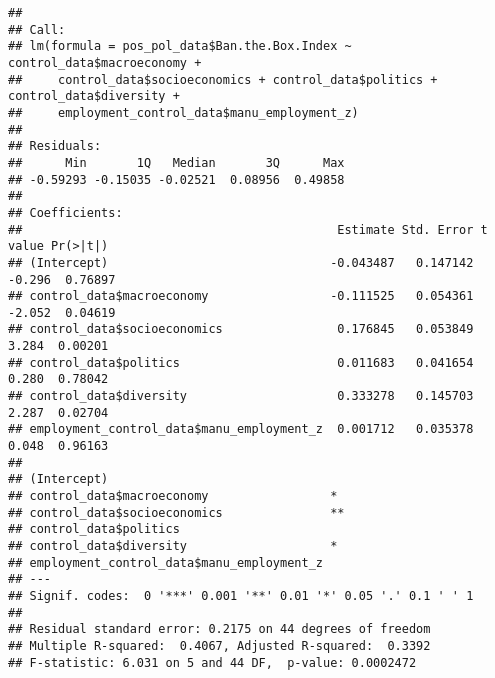 \documentclass[
]{article}
\newenvironment{Shaded}{\begin{snugshade}}{\end{snugshade}}
\newcommand{\CommentTok}[1]{\textcolor[rgb]{0.56,0.35,0.01}{\textit{#1}}}
\newcommand{\FunctionTok}[1]{\textcolor[rgb]{0.13,0.29,0.53}{\textbf{#1}}}
\newcommand{\NormalTok}[1]{#1}
\newcommand{\OtherTok}[1]{\textcolor[rgb]{0.56,0.35,0.01}{#1}}
\newcommand{\SpecialCharTok}[1]{\textcolor[rgb]{0.81,0.36,0.00}{\textbf{#1}}}
\begin{document}
\begin{Shaded}
\end{Shaded}

\begin{verbatim}
## 
## Call:
## lm(formula = pos_pol_data$Ban.the.Box.Index ~ control_data$macroeconomy + 
##     control_data$socioeconomics + control_data$politics + control_data$diversity + 
##     employment_control_data$manu_employment_z)
## 
## Residuals:
##      Min       1Q   Median       3Q      Max 
## -0.59293 -0.15035 -0.02521  0.08956  0.49858 
## 
## Coefficients:
##                                            Estimate Std. Error t value Pr(>|t|)
## (Intercept)                               -0.043487   0.147142  -0.296  0.76897
## control_data$macroeconomy                 -0.111525   0.054361  -2.052  0.04619
## control_data$socioeconomics                0.176845   0.053849   3.284  0.00201
## control_data$politics                      0.011683   0.041654   0.280  0.78042
## control_data$diversity                     0.333278   0.145703   2.287  0.02704
## employment_control_data$manu_employment_z  0.001712   0.035378   0.048  0.96163
##                                             
## (Intercept)                                 
## control_data$macroeconomy                 * 
## control_data$socioeconomics               **
## control_data$politics                       
## control_data$diversity                    * 
## employment_control_data$manu_employment_z   
## ---
## Signif. codes:  0 '***' 0.001 '**' 0.01 '*' 0.05 '.' 0.1 ' ' 1
## 
## Residual standard error: 0.2175 on 44 degrees of freedom
## Multiple R-squared:  0.4067, Adjusted R-squared:  0.3392 
## F-statistic: 6.031 on 5 and 44 DF,  p-value: 0.0002472
\end{verbatim}
\end{document}
